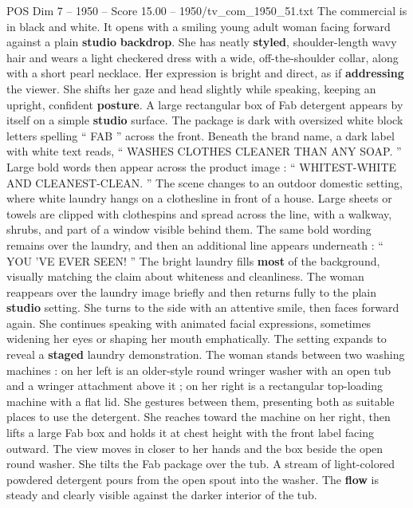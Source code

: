\begin{textsample}{POS Dim 7 – 1950 – Score 15.00 – 1950/tv\_com\_1950\_51.txt}  \label{ex:f7_pos_016}
The commercial is in black and white.
It opens with a smiling young adult woman facing forward against a plain \textbf{studio} \textbf{backdrop}.
She has neatly \textbf{styled}, shoulder-length wavy hair and wears a light checkered dress with a wide, off-the-shoulder collar, along with a short pearl necklace.
Her expression is bright and direct, as if \textbf{addressing} the viewer.
She shifts her gaze and head slightly while speaking, keeping an upright, confident \textbf{posture}.
A large rectangular box of Fab detergent appears by itself on a simple \textbf{studio} surface.
The package is dark with oversized white block letters spelling “ FAB ” across the front.
Beneath the brand name, a dark label with white text reads, “ WASHES CLOTHES CLEANER THAN ANY SOAP. ” Large bold words then appear across the product image : “ WHITEST-WHITE AND CLEANEST-CLEAN. ” The scene changes to an outdoor domestic setting, where white laundry hangs on a clothesline in front of a house.
Large sheets or towels are clipped with clothespins and spread across the line, with a walkway, shrubs, and part of a window visible behind them.
The same bold wording remains over the laundry, and then an additional line appears underneath : “ YOU ’VE EVER SEEN! ” The bright laundry fills \textbf{most} of the background, visually matching the claim about whiteness and cleanliness.
The woman reappears over the laundry image briefly and then returns fully to the plain \textbf{studio} setting.
She turns to the side with an attentive smile, then faces forward again.
She continues speaking with animated facial expressions, sometimes widening her eyes or shaping her mouth emphatically.
The setting expands to reveal a \textbf{staged} laundry demonstration.
The woman stands between two washing machines : on her left is an older-style round wringer washer with an open tub and a wringer attachment above it ; on her right is a rectangular top-loading machine with a flat lid.
She gestures between them, presenting both as suitable places to use the detergent.
She reaches toward the machine on her right, then lifts a large Fab box and holds it at chest height with the front label facing outward.
The view moves in closer to her hands and the box beside the open round washer.
She tilts the Fab package over the tub.
A stream of light-colored powdered detergent pours from the open spout into the washer.
The \textbf{flow} is steady and clearly visible against the darker interior of the tub.

\end{textsample}
